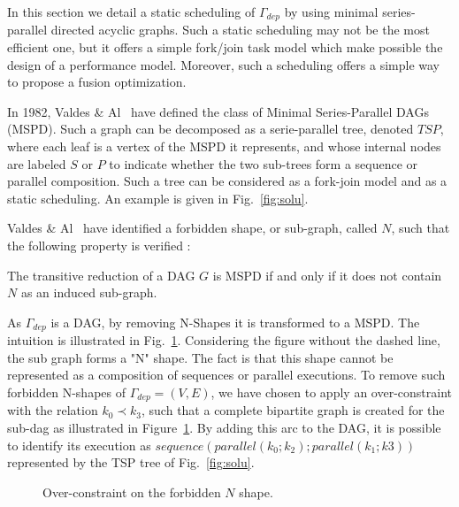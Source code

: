 In this section we detail a static scheduling of $\Gamma_{dep}$ by using minimal series-parallel directed acyclic graphs. Such a static scheduling may not be the most efficient one, but it offers a simple fork/join task model which make possible the design of a performance model. Moreover, such a scheduling offers a simple way to propose a fusion optimization. 

In 1982, Valdes \& Al~\cite{Valdes:1979:RSP:800135.804393} have defined the class of Minimal Series-Parallel DAGs (MSPD). Such a graph can be decomposed as a serie-parallel tree, denoted $TSP$, where each leaf is a vertex of the MSPD it represents, and whose internal nodes are labeled $S$ or $P$ to indicate whether the two sub-trees form a sequence or parallel composition. Such a tree can be considered as a fork-join model and as a static scheduling. An example is given in Fig.~\ref{fig:solu}.

Valdes \& Al~\cite{Valdes:1979:RSP:800135.804393} have identified a forbidden shape, or sub-graph, called $N$, such that the following property is verified :

\begin{myth}
The transitive reduction of a DAG $G$ is MSPD if and only if it does not contain $N$ as an induced sub-graph.
\end{myth}

As $\Gamma_{dep}$ is a DAG, by removing N-Shapes it is transformed to a MSPD. The intuition is illustrated in Fig.~\ref{fig:over}. Considering the figure without the dashed line, the sub graph forms a "N" shape. The fact is that this shape cannot be represented as a composition of sequences or parallel executions.
To remove such forbidden N-shapes of $\Gamma_{dep}=(V,E)$, we have chosen to apply an over-constraint with the relation $k_0 \prec k_3$, such that a complete bipartite graph is created for the sub-dag as illustrated in Figure~\ref{fig:over}. By adding this arc to the DAG, it is possible to identify its execution as $sequence(parallel(k_0;k_2);parallel(k_1;k3))$ represented by the TSP tree of Fig.~\ref{fig:solu}.

\begin{figure}[h!]
\begin{center}
\caption{Over-constraint on the forbidden $N$ shape.}
\label{fig:over}
\end{center}
\end{figure}

